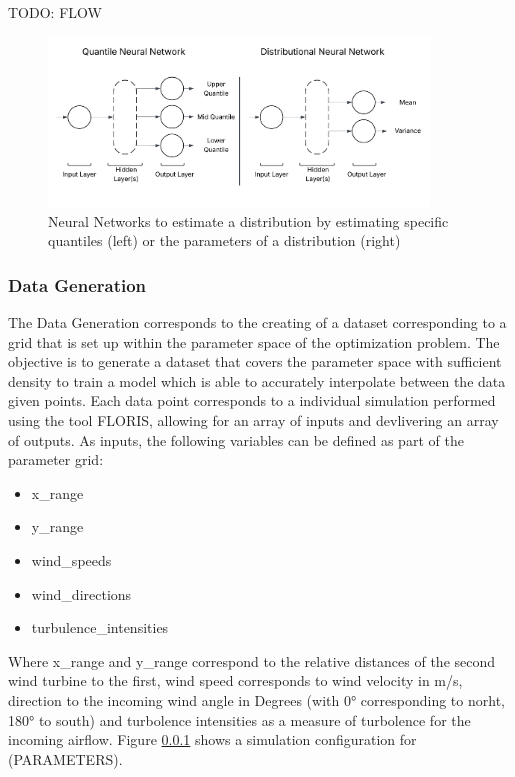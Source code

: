 TODO: FLOW
\begin{figure}[h] 
	\centering
	\includegraphics[width=0.9\textwidth]{figures/modelling/quantile_dist_nn.png} 
	\caption{Neural Networks to estimate a distribution by estimating specific quantiles (left) or the parameters of a distribution (right)}
	\label{fig:quantile_dist_nn}
\end{figure}

\subsubsection{Data Generation}

The Data Generation corresponds to the creating of a dataset corresponding to a grid that is set up within the parameter space of the optimization problem. The objective is to generate a dataset that covers the parameter space with sufficient density to train a model which is able to accurately interpolate between the data given points. Each  data point corresponds to a individual simulation performed using the tool FLORIS, allowing for an array of inputs and devlivering an array of outputs. As inputs, the following variables can be defined as part of the parameter grid:

\begin{itemize}
	\item x\_range
	\item y\_range
	\item wind\_speeds
	\item wind\_directions
	\item turbulence\_intensities
\end{itemize}

Where x\_range and y\_range correspond to the relative distances of the second wind turbine to the first, wind speed corresponds to wind velocity in m/s,  direction to the incoming wind angle in Degrees (with 0° corresponding to norht, 180° to south) and turbolence intensities as a measure of turbolence for the incoming airflow. Figure \ref{} shows a simulation configuration for (PARAMETERS). 

